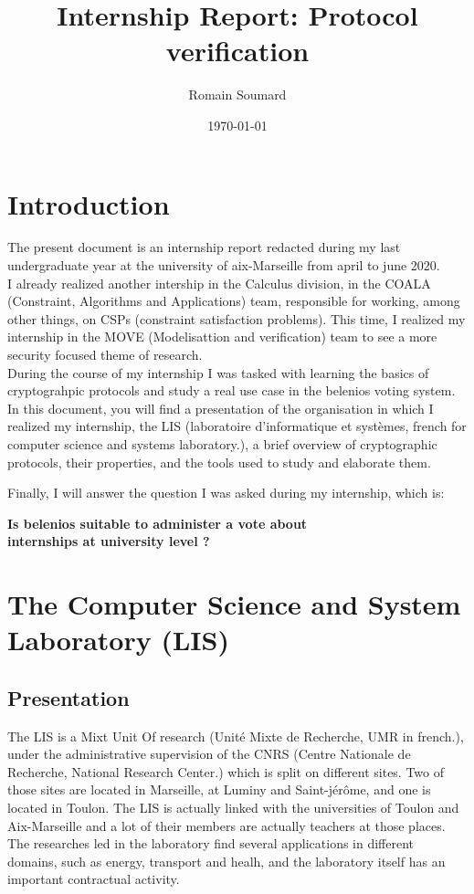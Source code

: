\documentclass[12pt, a4paper]{report}
\title{\color{blue}Internship Report: Protocol verification}
\author{Romain Soumard}
\date{\today}
\begin{document}
\maketitle

\section{Introduction}

The present document is an internship report redacted during my last undergraduate year at the university of aix-Marseille from april to june 2020.\\ 

I already realized another intership in the Calculus division, in the COALA (Constraint, Algorithms and Applications) team, responsible for working, among other things, on CSPs (constraint satisfaction problems). This time, I realized my internship in the MOVE (Modelisattion and verification) team to see a more security focused theme of research.\\

During the course of my internship I was tasked with learning the basics of cryptograhpic protocols and study a real use case in the belenios voting system.
In this document, you will find a presentation of the organisation in which I realized my internship, the LIS (laboratoire d'informatique et systèmes, french for computer science and systems laboratory.), a brief overview of cryptographic protocols, their properties, and the tools used to study and elaborate them.

Finally, I will answer the question I was asked during my internship, which is:\\

\begin{center}
\textbf{Is belenios suitable to administer a vote about\\ internships at university level ?}

\end{center}
 

\section{The Computer Science and System Laboratory (LIS)}

\subsection{Presentation}

The LIS is a Mixt Unit Of research (Unité Mixte de Recherche, UMR in french.), under the administrative supervision of the CNRS (Centre Nationale de Recherche, National Research Center.) which is split on different sites.
Two of those sites are located in Marseille, at Luminy and Saint-jérôme, and one is located in Toulon.
The LIS is actually linked with the universities of Toulon and Aix-Marseille and a lot of their members are actually teachers at those places.
The researches led in the laboratory find several applications in different domains, such as energy, transport and healh, and the laboratory itself has an important contractual activity.
\end{document}
